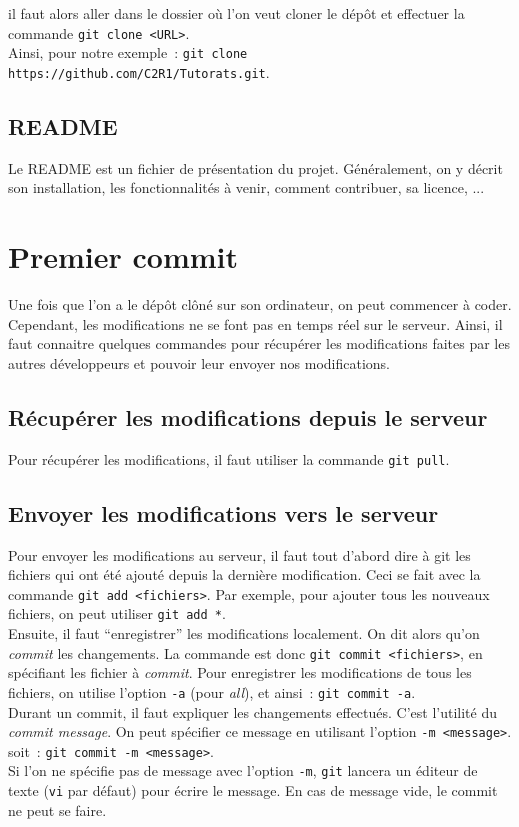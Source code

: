 \documentclass[a4paper,10pt]{report}
\begin{document}
il faut alors aller dans le dossier o\`u l'on veut cloner le d\'ep\^ot et effectuer la commande \verb|git clone <URL>|.\\
Ainsi, pour notre exemple~: \verb|git clone https://github.com/C2R1/Tutorats.git|.

    \subsection{README}
Le README est un fichier de pr\'esentation du projet. G\'en\'eralement, on y d\'ecrit son installation, les fonctionnalit\'es \`a venir, comment contribuer, sa licence, ...
  \section{Premier commit}
Une fois que l'on a le d\'ep\^ot cl\^on\'e sur son ordinateur, on peut commencer \`a coder. Cependant, les modifications ne se font pas en temps r\'eel sur le serveur. Ainsi, il faut connaitre quelques commandes pour r\'ecup\'erer les modifications faites par les autres d\'eveloppeurs et pouvoir leur envoyer nos modifications.
     \subsection{R\'ecup\'erer les modifications depuis le serveur}
Pour r\'ecup\'erer les modifications, il faut utiliser la commande \verb|git pull|.
     \subsection{Envoyer les modifications vers le serveur}
Pour envoyer les modifications au serveur, il faut tout d'abord dire \`a git les fichiers qui ont \'et\'e ajout\'e depuis la derni\`ere modification. Ceci se fait avec la commande \verb|git add <fichiers>|. Par exemple, pour ajouter tous les nouveaux fichiers, on peut utiliser \verb|git add *|.\\

Ensuite, il faut ``enregistrer'' les modifications localement. On dit alors qu'on \emph{commit} les changements. La commande est donc \verb|git commit <fichiers>|, en sp\'ecifiant les fichier \`a \emph{commit}. Pour enregistrer les modifications de tous les fichiers, on utilise l'option \verb|-a| (pour \emph{all}), et ainsi~: \verb|git commit -a|.\\
Durant un commit, il faut expliquer les changements effectu\'es. C'est l'utilit\'e du \emph{commit message}. On peut sp\'ecifier ce message en utilisant l'option \verb|-m <message>|. soit~: \verb|git commit -m <message>|.\\
Si l'on ne sp\'ecifie pas de message avec l'option \verb|-m|, \verb|git| lancera un \'editeur de texte (\verb|vi| par d\'efaut) pour \'ecrire le message. En cas de message vide, le commit ne peut se faire.\\
\end{document}
